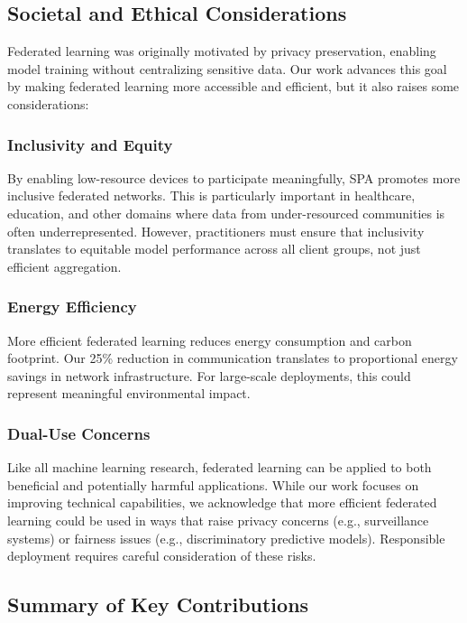\documentclass[conference]{IEEEtran}
\begin{document}
\subsection{Societal and Ethical Considerations}

Federated learning was originally motivated by privacy preservation, enabling model training without centralizing sensitive data. Our work advances this goal by making federated learning more accessible and efficient, but it also raises some considerations:

\subsubsection{Inclusivity and Equity}

By enabling low-resource devices to participate meaningfully, SPA promotes more inclusive federated networks. This is particularly important in healthcare, education, and other domains where data from under-resourced communities is often underrepresented. However, practitioners must ensure that inclusivity translates to equitable model performance across all client groups, not just efficient aggregation.

\subsubsection{Energy Efficiency}

More efficient federated learning reduces energy consumption and carbon footprint. Our 25\% reduction in communication translates to proportional energy savings in network infrastructure. For large-scale deployments, this could represent meaningful environmental impact.

\subsubsection{Dual-Use Concerns}

Like all machine learning research, federated learning can be applied to both beneficial and potentially harmful applications. While our work focuses on improving technical capabilities, we acknowledge that more efficient federated learning could be used in ways that raise privacy concerns (e.g., surveillance systems) or fairness issues (e.g., discriminatory predictive models). Responsible deployment requires careful consideration of these risks.

\subsection{Summary of Key Contributions}
\end{document}
